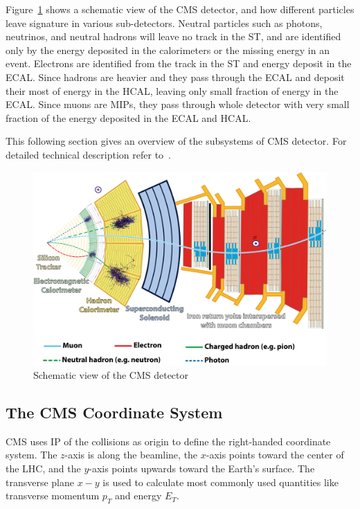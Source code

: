 Figure~\ref{fig:cms-slice} shows a schematic view of the \gls{CMS} detector, and
how different particles leave signature in various sub-detectors.
Neutral particles such as photons, neutrinos, and neutral hadrons will leave no track
in the \gls{ST}, and are identified only by the energy deposited
in the calorimeters or the missing energy in an event.
Electrons are identified from the track in the \gls{ST} and energy deposit
in the \gls{ECAL}. Since hadrons are heavier and they pass through the \gls{ECAL}
and deposit their most of energy in the \gls{HCAL}, leaving only small fraction
of energy in the \gls{ECAL}.
Since muons are \glspl{MIP}, they pass through whole detector with very small
fraction of the energy deposited in the \gls{ECAL} and \gls{HCAL}.

This following section gives an overview of the subsystems of \gls{CMS} detector.
For detailed technical description refer to~\cite{CMS-JINST-S08004}.

\begin{figure}[!ht]
  \centering
  \includegraphics[width=\textwidth]{figures/cms_slice.png}
  \caption[Schematic view of the CMS detector]%
  {Schematic view of the CMS detector~\cite{image-cms-slice}}%
  \label{fig:cms-slice}
\end{figure}

\clearpage{}
\subsection{
  The CMS Coordinate System
}\label{ch_cms:cms-coordinate}

CMS uses \gls{IP} of the collisions as origin to define the right-handed
coordinate system. The \( z \)-axis is along the beamline,
the \( x \)-axis points toward the center of the \gls{LHC},
and the \( y \)-axis points upwards toward the Earth's surface.
The transverse plane \( x - y \) is used to calculate
most commonly used quantities like transverse momentum \( p_{T} \)
and energy \( E_{T} \).

